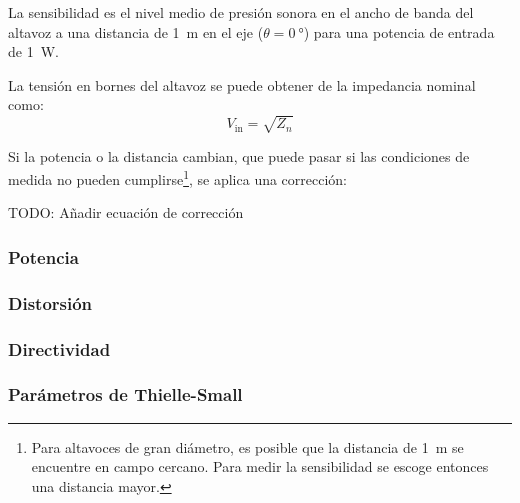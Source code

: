 \documentclass[12pt, a4paper]{article}
\begin{document}
La sensibilidad es el nivel medio de presión sonora en el ancho de banda del altavoz a una distancia de \qty{1}{\meter} en el eje ($\theta = \qty{0}{\degree}$) para una potencia de entrada de \qty{1}{\watt}.

La tensión en bornes del altavoz se puede obtener de la impedancia nominal como:
\[ V _{\text{in}} = \sqrt{Z_n} \]

Si la potencia o la distancia cambian, que puede pasar si las condiciones de medida no pueden cumplirse\footnote{Para altavoces de gran diámetro, es posible que la distancia de \qty{1}{\meter} se encuentre en campo cercano. Para medir la sensibilidad se escoge entonces una distancia mayor.}, se aplica una corrección:

TODO: Añadir ecuación de corrección

\subsubsection{Potencia}
\subsubsection{Distorsión}
\subsubsection{Directividad}
\subsubsection{Parámetros de Thielle-Small}
\end{document}
